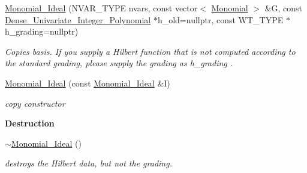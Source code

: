 \begin{Indent}
\begin{DoxyCompactItemize}
\hyperlink{class_monomial___ideal_af10301d05f7eac529acca28831e54eac}{Monomial\+\_\+\+Ideal} (N\+V\+A\+R\+\_\+\+T\+Y\+PE nvars, const vector$<$ \hyperlink{class_monomial}{Monomial} $>$ \&G, const \hyperlink{class_dense___univariate___integer___polynomial}{Dense\+\_\+\+Univariate\+\_\+\+Integer\+\_\+\+Polynomial} $\ast$h\+\_\+old=nullptr, const W\+T\+\_\+\+T\+Y\+PE $\ast$h\+\_\+grading=nullptr)
\begin{DoxyCompactList}\small\item\em Copies {\ttfamily basis}. If you supply a Hilbert function that is not computed according to the standard grading, please supply the grading as {\ttfamily h\+\_\+grading} . \end{DoxyCompactList}\item 
\mbox{\label{class_monomial___ideal_aa20312c8d7f14a18d73128a99d1d5c04}} 
\hyperlink{class_monomial___ideal_aa20312c8d7f14a18d73128a99d1d5c04}{Monomial\+\_\+\+Ideal} (const \hyperlink{class_monomial___ideal}{Monomial\+\_\+\+Ideal} \&I)
\begin{DoxyCompactList}\small\item\em copy constructor \end{DoxyCompactList}\end{DoxyCompactItemize}
\end{Indent}
\begin{Indent}\textbf{ Destruction}\par
\begin{DoxyCompactItemize}
\item 
\mbox{\label{class_monomial___ideal_a96f5e7396229382fbcbe8f7c4ceeaa65}} 
\hyperlink{class_monomial___ideal_a96f5e7396229382fbcbe8f7c4ceeaa65}{$\sim$\+Monomial\+\_\+\+Ideal} ()
\begin{DoxyCompactList}\small\item\em destroys the Hilbert data, but not the grading. \end{DoxyCompactList}\end{DoxyCompactItemize}
\end{Indent}

